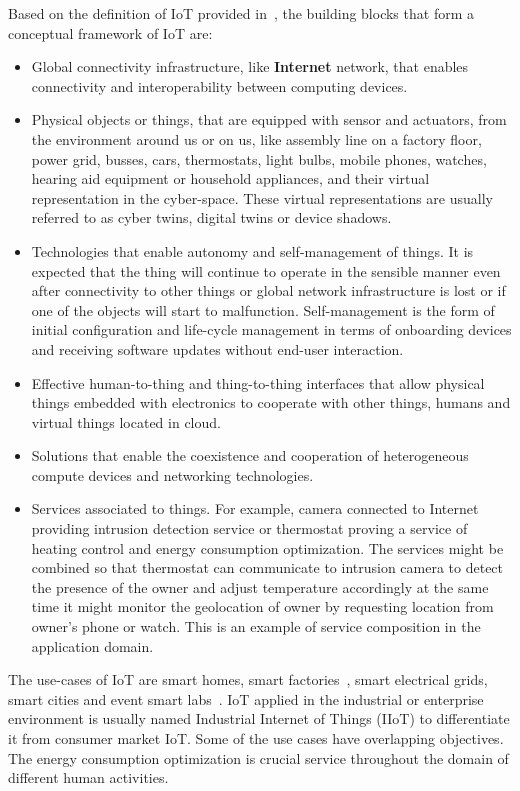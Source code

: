 \documentclass[english, 12pt, a4paper, elec, utf8, online]{aaltothesis}
\begin{document}
Based on the definition of IoT provided in~\cite{AtzoriIM17}, the building blocks that form a conceptual framework of IoT are:
\begin{itemize}
\item
Global connectivity infrastructure, like \textbf{Internet} network, that enables connectivity and interoperability between computing devices.
\item
Physical objects or things, that are equipped with sensor and actuators, from the environment around us or on us, like assembly line on a factory floor, power grid, busses, cars, thermostats, light bulbs, mobile phones, watches, hearing aid equipment or household appliances, and their virtual representation in the cyber-space. These virtual representations are usually referred to as cyber twins, digital twins or device shadows. 
\item
Technologies that enable autonomy and self-management of things. It is expected that the thing will continue to operate in the sensible manner even after connectivity to other things or global network infrastructure is lost or if one of the objects will start to malfunction. Self-management is the form of initial configuration and life-cycle management in terms of onboarding devices and receiving software updates without end-user interaction.
\item
Effective human-to-thing and thing-to-thing interfaces that allow physical things embedded with electronics to cooperate with other things, humans and virtual things located in cloud.  
\item
Solutions that enable the coexistence and cooperation of heterogeneous compute devices and networking technologies.
\item
Services associated to things. For example, camera connected to Internet providing intrusion detection service or thermostat proving a service of heating control and energy consumption optimization. The services might be combined so that thermostat can communicate to intrusion camera to detect the presence of the owner and adjust temperature accordingly at the same time it might monitor the geolocation of owner by requesting location from owner's phone or watch. This is an example of service composition in the application domain. 
\end{itemize}

The use-cases of IoT are smart homes, smart factories~\cite{wang2016implementing}, smart electrical grids, smart cities and event smart labs~\cite{perkel2017internet}. IoT applied in the industrial or enterprise environment is usually named Industrial Internet of Things (IIoT) to differentiate it from consumer market IoT. Some of the use cases have overlapping objectives. The energy consumption optimization is crucial service throughout the domain of different human activities.
\end{document}
